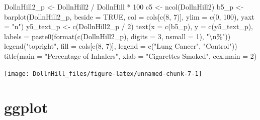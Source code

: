 \documentclass[
]{article}
\newenvironment{Shaded}{\begin{snugshade}}{\end{snugshade}}
\newcommand{\AttributeTok}[1]{\textcolor[rgb]{0.77,0.63,0.00}{#1}}
\newcommand{\ConstantTok}[1]{\textcolor[rgb]{0.00,0.00,0.00}{#1}}
\newcommand{\DecValTok}[1]{\textcolor[rgb]{0.00,0.00,0.81}{#1}}
\newcommand{\FunctionTok}[1]{\textcolor[rgb]{0.00,0.00,0.00}{#1}}
\newcommand{\NormalTok}[1]{#1}
\newcommand{\OtherTok}[1]{\textcolor[rgb]{0.56,0.35,0.01}{#1}}
\newcommand{\SpecialCharTok}[1]{\textcolor[rgb]{0.00,0.00,0.00}{#1}}
\newcommand{\StringTok}[1]{\textcolor[rgb]{0.31,0.60,0.02}{#1}}
\begin{document}
\begin{Shaded}
\begin{Highlighting}[]
\NormalTok{DollnHill2\_p }\OtherTok{\textless{}{-}}\NormalTok{ DollnHill2 }\SpecialCharTok{/}\NormalTok{ DollnHill }\SpecialCharTok{*} \DecValTok{100}
\NormalTok{c5 }\OtherTok{\textless{}{-}} \FunctionTok{ncol}\NormalTok{(DollnHill2)}
\NormalTok{b5\_p }\OtherTok{\textless{}{-}} \FunctionTok{barplot}\NormalTok{(DollnHill2\_p, }
                \AttributeTok{beside =} \ConstantTok{TRUE}\NormalTok{,}
                \AttributeTok{col =}\NormalTok{ cols[}\FunctionTok{c}\NormalTok{(}\DecValTok{8}\NormalTok{, }\DecValTok{7}\NormalTok{)], }
                \AttributeTok{ylim =} \FunctionTok{c}\NormalTok{(}\DecValTok{0}\NormalTok{, }\DecValTok{100}\NormalTok{),}
                \AttributeTok{yaxt =} \StringTok{"n"}\NormalTok{)}
\NormalTok{y5\_text\_p }\OtherTok{\textless{}{-}} \FunctionTok{c}\NormalTok{(DollnHill2\_p }\SpecialCharTok{/} \DecValTok{2}\NormalTok{)}
\FunctionTok{text}\NormalTok{(}\AttributeTok{x =} \FunctionTok{c}\NormalTok{(b5\_p), }
     \AttributeTok{y =} \FunctionTok{c}\NormalTok{(y5\_text\_p), }
     \AttributeTok{labels =} \FunctionTok{paste0}\NormalTok{(}\FunctionTok{format}\NormalTok{(}\FunctionTok{c}\NormalTok{(DollnHill2\_p), }
                            \AttributeTok{digits =} \DecValTok{3}\NormalTok{, }
                            \AttributeTok{nsmall =} \DecValTok{1}\NormalTok{), }\StringTok{"}\SpecialCharTok{\textbackslash{}n}\StringTok{\%"}\NormalTok{))}
\FunctionTok{legend}\NormalTok{(}\StringTok{"topright"}\NormalTok{, }
       \AttributeTok{fill =}\NormalTok{ cols[}\FunctionTok{c}\NormalTok{(}\DecValTok{8}\NormalTok{, }\DecValTok{7}\NormalTok{)], }
       \AttributeTok{legend =} \FunctionTok{c}\NormalTok{(}\StringTok{"Lung Cancer"}\NormalTok{, }\StringTok{"Control"}\NormalTok{))}
\FunctionTok{title}\NormalTok{(}\AttributeTok{main =} \StringTok{"Percentage of Inhalers"}\NormalTok{,}
      \AttributeTok{xlab =} \StringTok{"Cigarettes Smoked"}\NormalTok{,}
      \AttributeTok{cex.main =} \DecValTok{2}\NormalTok{)}
\end{Highlighting}
\end{Shaded}

\begin{flushleft}\texttt{[image: DollnHill\_files/figure-latex/unnamed-chunk-7-1]} \end{flushleft}

\hypertarget{ggplot}{%
\section{ggplot}\label{ggplot}}
\end{document}
